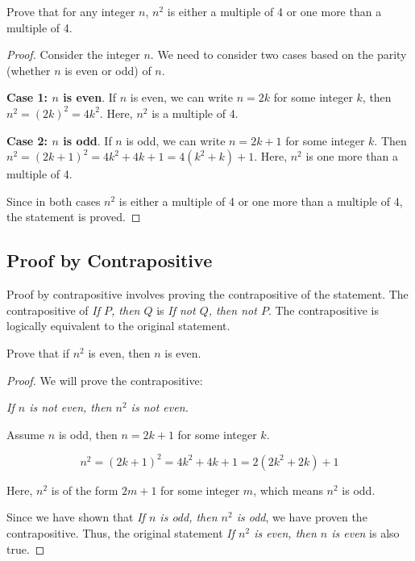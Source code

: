 \documentclass{article}
\theoremstyle{mytheoremstyle}
\theoremstyle{mytheoremstyle}
\theoremstyle{myexamplestyle}
\begin{document}
\begin{example}
    Prove that for any integer \( n \), \( n^2 \) is either a multiple of 4 or one more than a multiple of 4.

    \begin{proof}
        Consider the integer \( n \). We need to consider two cases based on the parity (whether \( n \) is even or odd) of \( n \).

        \textbf{Case 1: \( n \) is even}.
        If \( n \) is even, we can write \( n = 2k \) for some
        integer \( k \), then \( n^2 = (2k)^2 = 4k^2 \). Here,
        \( n^2 \) is a multiple of 4.

        \textbf{Case 2: \( n \) is odd}.
        If \( n \) is odd, we can write \( n = 2k + 1 \) for some integer \( k \). Then
        \( n^2 = (2k + 1)^2 = 4k^2 + 4k + 1 = 4(k^2 + k) + 1 \).
        Here, \( n^2 \) is one more than a multiple of 4.

        Since in both cases \( n^2 \) is either a multiple of 4 or one more than a multiple of 4, the statement is proved.
    \end{proof}
\end{example}

\newpage

\subsection{Proof by Contrapositive}

Proof by contrapositive involves proving the contrapositive of the statement. The contrapositive of \emph{If \( P \), then \( Q \)} is \emph{If not \( Q \), then not \( P \)}. The contrapositive is logically equivalent to the original statement.


\begin{example}
    Prove that if \( n^2 \) is even, then \( n \) is even.

    \begin{proof}

        We will prove the contrapositive:

        \begin{center}
            \emph{If \( n \) is not even, then \( n^2 \) is not even.}
        \end{center}

        Assume \( n \) is odd, then \( n = 2k + 1 \) for some integer \( k \).

        \[ n^2 = (2k + 1)^2 = 4k^2 + 4k + 1 = 2(2k^2 + 2k) + 1 \]

        Here, \( n^2 \) is of the form \( 2m + 1 \) for some integer \( m \), which means \( n^2 \) is odd.

        Since we have shown that \emph{If \( n \) is odd, then \( n^2 \) is odd}, we have proven the contrapositive. Thus, the original statement \emph{If \( n^2 \) is even, then \( n \) is even} is also true.
    \end{proof}
\end{example}
\end{document}

